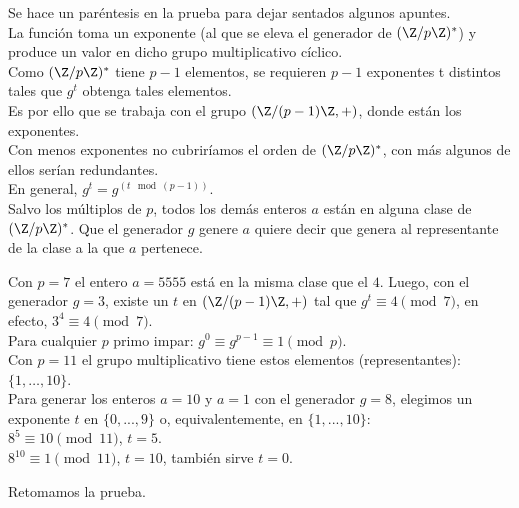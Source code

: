 Se hace un paréntesis en la prueba para dejar sentados algunos apuntes.\\
La función toma un exponente (al que se eleva el generador de $(\Z/p\Z)^{*}$) y produce un valor en dicho grupo multiplicativo cíclico. \\
Como $(\Z/p\Z)^{*}$ tiene $p-1$ elementos, se requieren $p-1$ exponentes t distintos tales que $g^t$ obtenga tales elementos. \\
Es por ello que se trabaja con el grupo $(\Z/(p-1)\Z,+)$, donde están los exponentes. \\
Con menos exponentes no cubriríamos el orden de $(\Z/p\Z)^{*}$, con más algunos de ellos serían redundantes. \\
En general, $g^t = g^{(t \mod (p-1))}$. \\

Salvo los múltiplos de $p$, todos los demás enteros $a$ están en alguna clase de $(\Z/p\Z)^{*}$. Que el generador $g$ genere $a$ quiere decir que genera al representante de la clase a la que $a$ pertenece.

\begin{ejemplo} 
Con $p=7$ el entero $a=5555$ está en la misma clase que el $4$. Luego, con el generador $g=3$, existe un $t$ en $(\Z/(p-1)\Z,+)$ tal que $g^t \equiv 4 \pmod 7$, en efecto, $3^4 \equiv 4 \pmod 7$. \\
Para cualquier $p$ primo impar: $g^0 \equiv g^{p-1} \equiv 1 \pmod p$. \\
Con $p=11$ el grupo multiplicativo tiene estos elementos (representantes): $\{1, \dots, 10\}$. \\
Para generar los enteros $a=10$ y $a=1$ con el generador $g=8$, elegimos un exponente $t$ en $\{0,...,9\}$ o, equivalentemente, en $\{1,...,10\}$: \\
$8^{5} \equiv 10 \pmod {11}$, $t=5$. \\
$8^{10} \equiv 1 \pmod {11}$, $t=10$, también sirve $t=0$.
\end{ejemplo}

Retomamos la prueba.

